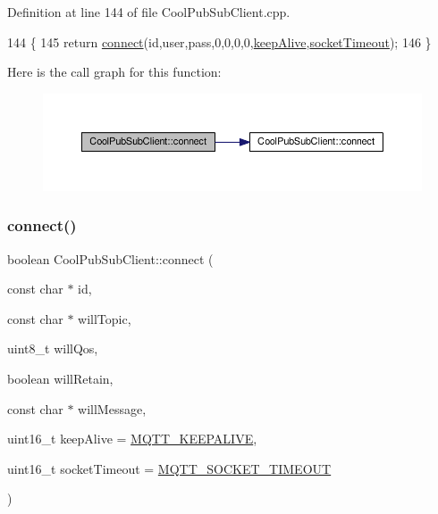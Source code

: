 Definition at line 144 of file Cool\+Pub\+Sub\+Client.\+cpp.


\begin{DoxyCode}
144                                                                                                            
                           \{
145     \textcolor{keywordflow}{return} \hyperlink{class_cool_pub_sub_client_a2664c2ebc302b2fa49f493a339ecc891}{connect}(\textcolor{keywordtype}{id},user,pass,0,0,0,0,\hyperlink{class_cool_pub_sub_client_a653f086eb3a039c08116bb828e35f7c1}{keepAlive},\hyperlink{class_cool_pub_sub_client_a2d7b7c7dda1313ff1492b158c3712630}{socketTimeout});
146  \}
\end{DoxyCode}
Here is the call graph for this function\+:\nopagebreak
\begin{figure}[H]
\begin{center}
\leavevmode
\includegraphics[width=350pt]{d8/d4b/class_cool_pub_sub_client_a7f30e39bf4ca5ea5fb9747c403639a03_cgraph}
\end{center}
\end{figure}
\mbox{\label{class_cool_pub_sub_client_af461a5a08fda1c3237e706965704ddb6}} 
\subsubsection{\texorpdfstring{connect()}{connect()}\hspace{0.1cm}{\footnotesize\ttfamily [3/4]}}
{\footnotesize\ttfamily boolean Cool\+Pub\+Sub\+Client\+::connect (\begin{DoxyParamCaption}\item[{const char $\ast$}]{id,  }\item[{const char $\ast$}]{will\+Topic,  }\item[{uint8\+\_\+t}]{will\+Qos,  }\item[{boolean}]{will\+Retain,  }\item[{const char $\ast$}]{will\+Message,  }\item[{uint16\+\_\+t}]{keep\+Alive = {\ttfamily \hyperlink{_cool_pub_sub_client_8h_afb4dd8c75385ab30e659314df7c2c335}{M\+Q\+T\+T\+\_\+\+K\+E\+E\+P\+A\+L\+I\+VE}},  }\item[{uint16\+\_\+t}]{socket\+Timeout = {\ttfamily \hyperlink{_cool_pub_sub_client_8h_a092cc564e4d7f03fdab6137e30a7f05b}{M\+Q\+T\+T\+\_\+\+S\+O\+C\+K\+E\+T\+\_\+\+T\+I\+M\+E\+O\+UT}} }\end{DoxyParamCaption})}



